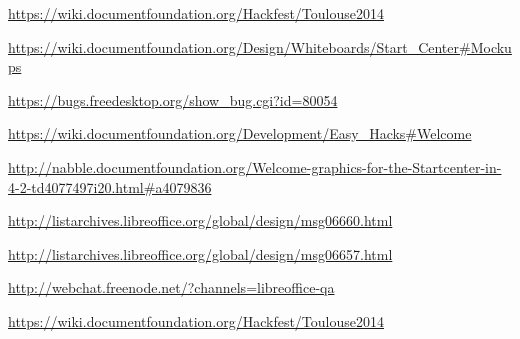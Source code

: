 \documentclass{article}
\begin{document}
\begin{thebibliography}{30}
    \url{https://wiki.documentfoundation.org/Hackfest/Toulouse2014}

    \url{https://wiki.documentfoundation.org/Design/Whiteboards/Start_Center#Mockups}

    \url{https://bugs.freedesktop.org/show_bug.cgi?id=80054}

    \url{https://wiki.documentfoundation.org/Development/Easy_Hacks#Welcome}

    \url{http://nabble.documentfoundation.org/Welcome-graphics-for-the-Startcenter-in-4-2-td4077497i20.html#a4079836}

    \url{http://listarchives.libreoffice.org/global/design/msg06660.html}

    \url{http://listarchives.libreoffice.org/global/design/msg06657.html}

    \url{http://webchat.freenode.net/?channels=libreoffice-qa}

    \url{https://wiki.documentfoundation.org/Hackfest/Toulouse2014}
 

\end{thebibliography}
\end{document}
